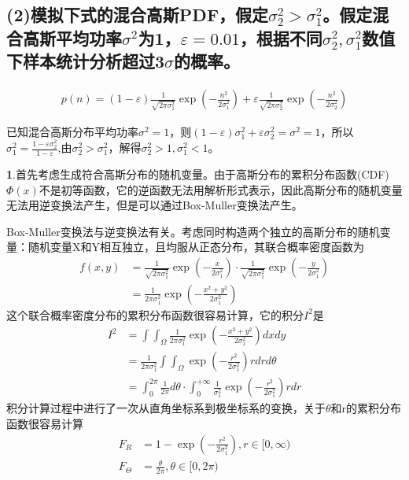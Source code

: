\documentclass[fontset=windows]{article}
\numberwithin{figure}{section}
\begin{document}
\subsection*{(2)模拟下式的混合高斯PDF，假定\(\sigma^2_2>\sigma^2_1\)。假定混合高斯平均功率\(\sigma^2\)为1，\(\varepsilon=0.01\)，根据不同\(\sigma^2_2,\sigma^2_1\)数值下样本统计分析超过3\(\sigma\)的概率。}
\begin{align*}
    p(n)=(1-\varepsilon)\frac{1}{\sqrt{2\pi \sigma^2_1}}\exp\left(-\frac{n^2}{2\sigma^2_1}\right)+
    \varepsilon \frac{1}{\sqrt{2\pi \sigma^2_2}}\exp\left(-\frac{n^2}{2\sigma^2_2}\right)
\end{align*}

已知混合高斯分布平均功率\(\sigma^2=1\)，则\((1-\varepsilon)\sigma^2_1+\varepsilon\sigma^2_2=\sigma^2=1\)，所以\(\sigma^2_1=\frac{1-\varepsilon\sigma^2_2}{1-\varepsilon}\),由\(\sigma^2_2>\sigma^2_1\)，解得\(\sigma^2_2>1,\sigma^2_1<1\)。

\textbf{1}.首先考虑生成符合高斯分布的随机变量。由于高斯分布的累积分布函数(CDF)\(\Phi(x)\)不是初等函数，它的逆函数无法用解析形式表示，因此高斯分布的随机变量无法用逆变换法产生，但是可以通过Box-Muller变换法产生。

Box-Muller变换法与逆变换法有关。考虑同时构造两个独立的高斯分布的随机变量：随机变量X和Y相互独立，且均服从正态分布，其联合概率密度函数为
\begin{align*}
    f(x,y)
     & =\frac{1}{\sqrt{2\pi \sigma^2_1}}\exp(-\frac{x}{2\sigma^2_1})\cdot
    \frac{1}{\sqrt{2\pi\sigma^2_1}}\exp(-\frac{y}{2\sigma^2_1})           \\
     & =\frac{1}{2\pi \sigma^2_1}\exp(-\frac{x^2+y^2}{2\sigma^2_1})
\end{align*}
这个联合概率密度分布的累积分布函数很容易计算，它的积分\(I^2\)是
\begin{align*}
    I^2
     & =\int \int_{\Omega}\frac{1}{2\pi \sigma^2_1}\exp(-\frac{x^2+y^2}{2\sigma^2_1})dxdy   \\
     & =\frac{1}{2\pi \sigma^2_1}\int \int_{\Omega}\exp(-\frac{r^2}{2\sigma^2_1})rdrd\theta \\
     & =\int_{0}^{2\pi}\frac{1}{2\pi}d\theta \cdot
    \int_{0}^{+\infty}\frac{1}{\sigma^2_1}\exp(-\frac{r^2}{2\sigma^2_1})rdr
\end{align*}
积分计算过程中进行了一次从直角坐标系到极坐标系的变换，关于\(\theta\)和r的累积分布函数很容易计算
\begin{align*}
    F_R        & =1-\exp(-\frac{r^2}{2\sigma^2_1}),r\in [0,\infty) \\
    F_{\Theta} & =\frac{\theta}{2\pi },\theta\in [0,2\pi)
\end{align*}
\end{document}
